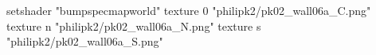 setshader "bumpspecmapworld"
    texture 0 "philipk2/pk02_wall06a_C.png"
    texture n "philipk2/pk02_wall06a_N.png"
    texture s "philipk2/pk02_wall06a_S.png"